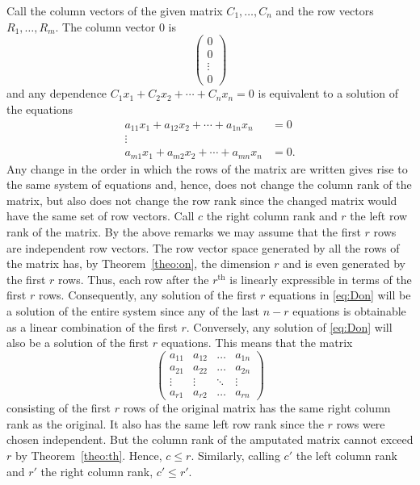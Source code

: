 \documentclass[10pt,leqno,a5paper]{book}
\theoremstyle{definition}
\begin{document}
Call the column vectors of the given matrix $C_1, \ldots, C_n$ and the row vectors $R_1, \ldots, R_m$.
The column vector $0$ is
\[
\begin{pmatrix}
0 \\ 0 \\ \vdots \\ 0
\end{pmatrix}
\]
and any dependence $C_1 x_1 + C_2 x_2 + \cdots + C_n x_n = 0$ is equivalent to a solution of the equations
\begin{equation}
\label{eq:Don}
\begin{aligned}
a_{11}x_1 + a_{12}x_2 + \cdots + a_{1n}x_n &= 0
\\
\vdots &
\\
a_{m1}x_1 + a_{m2}x_2 + \cdots + a_{mn}x_n &= 0.
\end{aligned}
\end{equation}
Any change in the order in which the rows of the matrix are written gives rise to the same system of equations and, hence, does not change the column rank of the matrix, but also does not change the row rank since the changed matrix would have the same set of row vectors.
Call $c$ the right column rank and $r$ the left row rank of the matrix.
By the above remarks we may assume that the first $r$ rows are independent row vectors.
The row vector space generated by all the rows of the matrix has, by Theorem~\ref{theo:on}, the dimension $r$ and is even generated by the first $r$ rows.
Thus, each row after the $r^{\text{th}}$ is linearly expressible in terms of the first $r$ rows.
Consequently, any solution of the first $r$ equations in \eqref{eq:Don} will be a solution of the entire system since any of the last $n-r$ equations is obtainable as a linear combination of the first $r$.
Conversely, any solution of \eqref{eq:Don} will also be a solution of the first $r$ equations.
This means that the matrix
\[
\begin{pmatrix}
a_{11} & a_{12} & \ldots & a_{1n}
\\
a_{21} & a_{22} & \ldots & a_{2n}
\\
\vdots & \vdots & \ddots & \vdots
\\
a_{r1} & a_{r2} & \ldots & a_{rn}
\end{pmatrix}
\]
consisting of the first $r$ rows of the original matrix has the same right column rank as the original.
It also has the same left row rank since the $r$ rows were chosen independent.
But the column rank of the amputated matrix cannot exceed $r$ by Theorem~\ref{theo:th}.
Hence, $c \leq r$.
Similarly, calling $c'$ the left column rank and $r'$ the right column rank, $c' \leq r'$.
\end{document}
